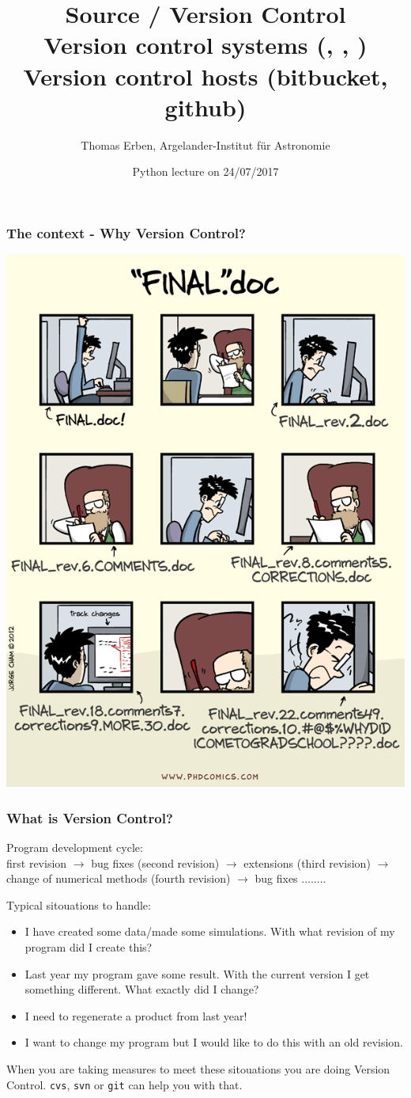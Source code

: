 \documentclass{beamer}
\title[] %
{Source / Version Control \\
Version control systems (\cvs, \svn, \git) \\
Version control hosts (bitbucket, github)}
\author[Thomas Erben] %
{Thomas Erben, Argelander-Institut f\"ur Astronomie}
\institute[] %
\date[]{Python lecture on 24/07/2017}
\newcommand{\git}{\texttt{git}\xspace}
\newcommand{\svn}{\texttt{svn}\xspace}
\newcommand{\cvs}{\texttt{cvs}\xspace}
\begin{document}
\begin{frame}
  \titlepage
\end{frame}
%
\begin{frame}
\frametitle{The context - Why Version Control?}
  \centerline{\includegraphics[height=0.75\textheight]{images/phd101212s}}
\end{frame}
%
\begin{frame}
\frametitle{What is Version Control?}
\small
{\color{red} Program development cycle:}\\
first {\color{blue} revision} $\rightarrow$ bug fixes (second revision)
$\rightarrow$ extensions (third revision) $\rightarrow$ change of
numerical methods (fourth revision) $\rightarrow$ bug fixes ........

\vspace{0.3cm}
{\color{red} Typical sitouations to handle:}
\begin{itemize}
\item I have created some data/made some simulations. With what revision of my
program did I create this?
\item Last year my program gave some result. With the current version
I get something different. What exactly did I change?
\item I need to regenerate a product from last year!
\item I want to change my program but I would like to do this with an old
revision.
\end{itemize}
When you are taking measures to meet these sitouations you are doing
{\color{blue} Version Control}. \cvs, \svn or \git can help you with that.
\end{frame}
\end{document}
